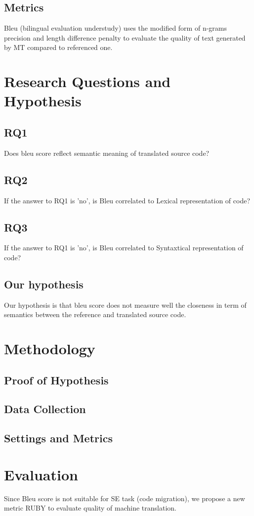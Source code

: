 \subsection{Metrics}
Bleu (bilingual evaluation understudy) uses the modified form of n-grams precision and length difference penalty to evaluate the quality of text generated by MT compared to referenced one.

\section{Research Questions and Hypothesis}
\subsection{RQ1}
Does bleu score reflect semantic meaning of translated source code?
\subsection{RQ2} 
If the answer to RQ1 is 'no', is Bleu correlated to Lexical representation of code?
\subsection{RQ3} 
If the answer to RQ1 is 'no', is Bleu correlated to Syntaxtical representation of code?
\subsection{Our hypothesis}
Our hypothesis is that bleu score does not measure well the closeness in term of semantics between the reference and translated source code. 
\section{Methodology}
\subsection{Proof of Hypothesis}
\subsection{Data Collection}
\subsection{Settings and Metrics}
\section{Evaluation}
Since Bleu score is not suitable for SE task (code migration), we propose a new metric RUBY to evaluate quality of machine translation. 
